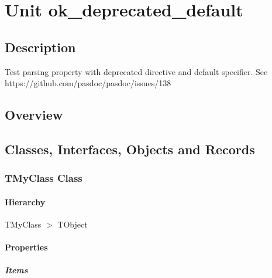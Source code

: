 \documentclass{report}
\begin{document}
\newlength{\tmplength}
\chapter{Unit ok{\_}deprecated{\_}default}
\section{Description}
Test parsing property with deprecated directive and default specifier. See https://github.com/pasdoc/pasdoc/issues/138
\section{Overview}
\begin{description}
\item[\texttt{\begin{ttfamily}TMyClass\end{ttfamily} Class}]
\end{description}
\section{Classes, Interfaces, Objects and Records}
\subsection*{TMyClass Class}
\subsubsection*{\large{\textbf{Hierarchy}}\normalsize\hspace{1ex}\hfill}
TMyClass {$>$} TObject
\subsubsection*{\large{\textbf{Properties}}\normalsize\hspace{1ex}\hfill}
\paragraph*{Items}\hspace*{\fill}
\end{document}

